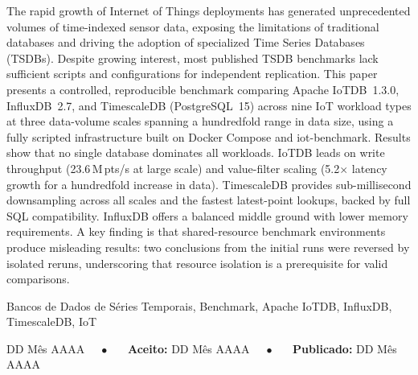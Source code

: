 \documentclass[brazilian]{presets/sbcreviews-2025}%
\begin{document}
\begin{frontmatter}
  \begin{abstract-en}
    The rapid growth of Internet of Things deployments has generated unprecedented volumes of
    time-indexed sensor data, exposing the limitations of traditional databases and driving the
    adoption of specialized Time Series Databases (TSDBs). Despite growing interest, most published
    TSDB benchmarks lack sufficient scripts and configurations for independent replication.
    This paper presents a controlled, reproducible benchmark comparing Apache IoTDB~1.3.0,
    InfluxDB~2.7, and TimescaleDB (PostgreSQL~15) across nine IoT workload types at three
    data-volume scales spanning a hundredfold range in data size, using a fully scripted infrastructure
    built on Docker Compose and iot-benchmark.
    Results show that no single database dominates all workloads. IoTDB leads on write throughput
    (23.6\,M\,pts/s at large scale) and value-filter scaling (5.2$\times$ latency growth for
    a hundredfold increase in data). TimescaleDB provides sub-millisecond downsampling across all scales and the
    fastest latest-point lookups, backed by full SQL compatibility. InfluxDB offers a balanced
    middle ground with lower memory requirements. A key finding is that shared-resource benchmark
    environments produce misleading results: two conclusions from the initial runs were reversed
    by isolated reruns, underscoring that resource isolation is a prerequisite for valid comparisons.
  \end{abstract-en}

  \begin{keywords}
    Bancos de Dados de Séries Temporais, Benchmark, Apache IoTDB, InfluxDB, TimescaleDB, IoT
  \end{keywords}

  \begin{dates}
     DD Mês AAAA~~~$\bullet$~~~
    {\sffamily\textbf{Aceito:}} DD Mês AAAA~~~$\bullet$~~~
    {\sffamily\textbf{Publicado:}} DD Mês AAAA

  \end{dates}

\end{frontmatter}







\end{document}
